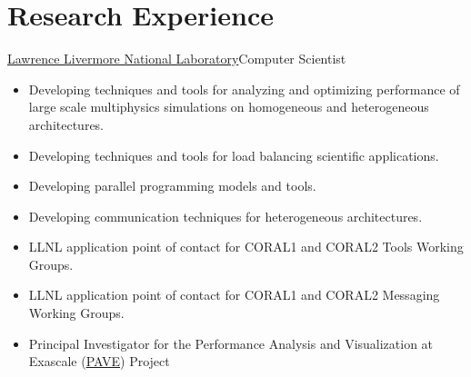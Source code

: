 \section{Research Experience}
		{\href{http://www.llnl.gov}{Lawrence Livermore National Laboratory}}{Computer Scientist}{}{}
		{\begin{itemize}
		\item Developing techniques and tools for analyzing and optimizing performance of large scale multiphysics simulations on homogeneous and heterogeneous architectures. 
		\item Developing techniques and tools for load balancing scientific applications. 
		\item Developing parallel programming models and tools.
		\item Developing communication techniques for heterogeneous architectures.
		\item LLNL application point of contact for CORAL1 and CORAL2 Tools Working Groups.
		\item LLNL application point of contact for CORAL1 and CORAL2 Messaging Working Groups.
		\item Principal Investigator for the Performance Analysis and Visualization at Exascale (\href{https://computing.llnl.gov/projects/pave-performance-analysis-visualization-exascale}{PAVE}) Project
		\end{itemize}}
		
